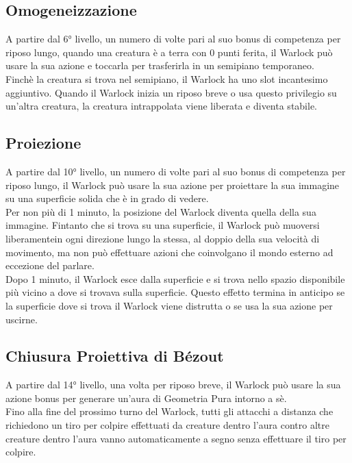 \subsection{}

\subsection{Omogeneizzazione}

A partire dal 6° livello, un numero di volte pari al suo bonus di competenza per riposo lungo, quando una creatura è a terra con 0 punti ferita, il Warlock può usare la sua azione e toccarla per trasferirla in un semipiano temporaneo. \\ Finchè la creatura si trova nel semipiano, il Warlock ha uno slot incantesimo aggiuntivo. Quando il Warlock inizia un riposo breve o usa questo privilegio su un'altra creatura, la creatura intrappolata viene liberata e diventa stabile.

\subsection{Proiezione}

A partire dal 10° livello, un numero di volte pari al suo bonus di competenza per riposo lungo, il Warlock può usare la sua azione per proiettare la sua immagine su una superficie solida che è in grado di vedere. \\ Per non più di 1 minuto, la posizione del Warlock diventa quella della sua immagine. Fintanto che si trova su una superficie, il Warlock può muoversi liberamentein ogni direzione lungo la stessa, al doppio della sua velocità di movimento, ma non può effettuare azioni che coinvolgano il mondo esterno ad eccezione del parlare. \\ Dopo 1 minuto, il Warlock esce dalla superficie e si trova nello spazio disponibile più vicino a dove si trovava sulla superficie. Questo effetto termina in anticipo se la superficie dove si trova il Warlock viene distrutta o se usa la sua azione per uscirne.

\subsection{Chiusura Proiettiva di Bézout}

A partire dal 14° livello, una volta per riposo breve, il Warlock può usare la sua azione bonus per generare un'aura di Geometria Pura intorno a sè. \\ Fino alla fine del prossimo turno del Warlock, tutti gli attacchi a distanza che richiedono un tiro per colpire effettuati da creature dentro l'aura contro altre creature dentro l'aura vanno automaticamente a segno senza effettuare il tiro per colpire.

